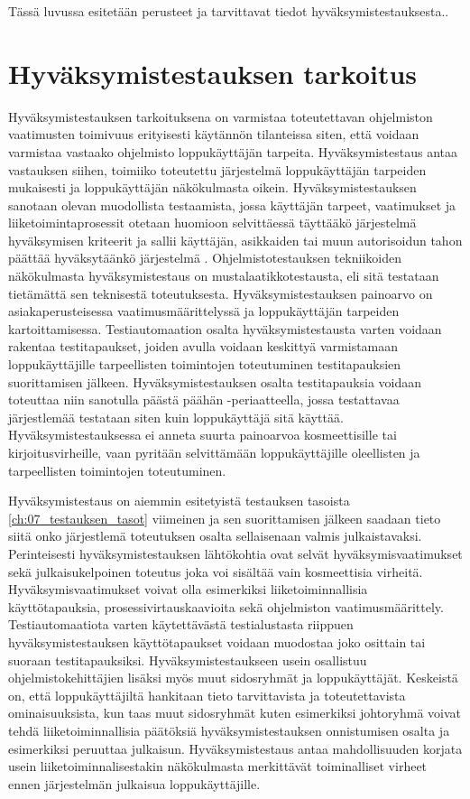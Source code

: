 Tässä luvussa esitetään perusteet ja tarvittavat tiedot hyväksymistestauksesta..

\section{Hyväksymistestauksen tarkoitus} \label{ch:08_hyvaksymistestauksen_tarkoitus}

  Hyväksymistestauksen tarkoituksena on varmistaa toteutettavan ohjelmiston vaatimusten toimivuus erityisesti käytännön tilanteissa siten, että voidaan varmistaa vastaako ohjelmisto loppukäyttäjän tarpeita.
  Hyväksymistestaus antaa vastauksen siihen, toimiiko toteutettu järjestelmä loppukäyttäjän tarpeiden mukaisesti ja loppukäyttäjän näkökulmasta oikein.
  Hyväksymistestauksen sanotaan olevan muodollista testaamista, jossa käyttäjän tarpeet, vaatimukset ja liiketoimintaprosessit otetaan huomioon selvittäessä täyttääkö järjestelmä hyväksymisen kriteerit ja sallii käyttäjän, asikkaiden tai muun autorisoidun tahon päättää hyväksytäänkö järjestelmä \parencite{istqb_glossary_nodate}.
  Ohjelmistotestauksen tekniikoiden näkökulmasta hyväksymistestaus on mustalaatikkotestausta, eli sitä testataan tietämättä sen teknisestä toteutuksesta.
  Hyväksymistestauksen painoarvo on asiakaperusteisessa vaatimusmäärittelyssä ja loppukäyttäjän tarpeiden kartoittamisessa.
  Testiautomaation osalta hyväksymistestausta varten voidaan rakentaa testitapaukset, joiden avulla voidaan keskittyä varmistamaan loppukäyttäjille tarpeellisten toimintojen toteutuminen testitapauksien suorittamisen jälkeen.
  Hyväksymistestauksen osalta testitapauksia voidaan toteuttaa niin sanotulla päästä päähän -periaatteella, jossa testattavaa järjestlemää testataan siten kuin loppukäyttäjä sitä käyttää.
  Hyväksymistestauksessa ei anneta suurta painoarvoa kosmeettisille tai kirjoitusvirheille, vaan pyritään selvittämään loppukäyttäjille oleellisten ja tarpeellisten toimintojen toteutuminen.

  Hyväksymistestaus on aiemmin esitetyistä testauksen tasoista \ref{ch:07_testauksen_tasot} viimeinen ja sen suorittamisen jälkeen saadaan tieto siitä onko järjestlemä toteutuksen osalta sellaisenaan valmis julkaistavaksi.
  Perinteisesti hyväksymistestauksen lähtökohtia ovat selvät hyväksymisvaatimukset sekä julkaisukelpoinen toteutus joka voi sisältää vain kosmeettisia virheitä.
  Hyväksymisvaatimukset voivat olla esimerkiksi liiketoiminnallisia käyttötapauksia, prosessivirtauskaavioita sekä ohjelmiston vaatimusmäärittely.
  Testiautomaatiota varten käytettävästä testialustasta riippuen hyväksymistestauksen käyttötapaukset voidaan muodostaa joko osittain tai suoraan testitapauksiksi.
  Hyväksymistestaukseen usein osallistuu ohjelmistokehittäjien lisäksi myös muut sidosryhmät ja loppukäyttäjät.
  Keskeistä on, että loppukäyttäjiltä hankitaan tieto tarvittavista ja toteutettavista ominaisuuksista, kun taas muut sidosryhmät kuten esimerkiksi johtoryhmä voivat tehdä liiketoiminnallisia päätöksiä hyväksymistestauksen onnistumisen osalta ja esimerkiksi peruuttaa julkaisun.
  Hyväksymistestaus antaa mahdollisuuden korjata usein liiketoiminnalisestakin näkökulmasta merkittävät toiminalliset virheet ennen järjestelmän julkaisua loppukäyttäjille.

